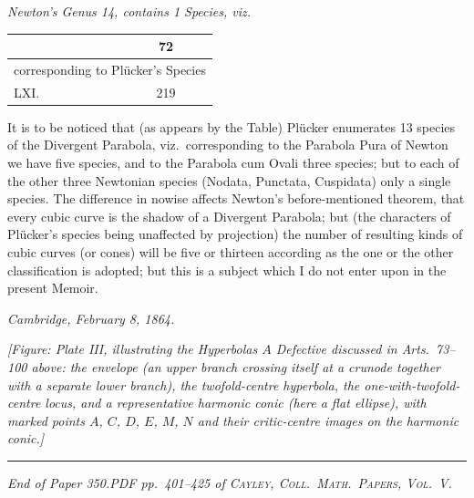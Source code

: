 \documentclass[11pt]{article}
\begin{document}
\medskip
\noindent\emph{Newton's Genus 14, contains 1 Species, viz.}
\begin{center}\small
\begin{tabular}{|l|c|}\hline
& 72 \\\hline
\multicolumn{2}{|l|}{\quad corresponding to Pl\"ucker's Species}\\\hline
LXI. & 219 \\\hline
\end{tabular}
\end{center}

\medskip
It is to be noticed that (as appears by the Table) Pl\"ucker enumerates 13 species of the Divergent Parabola, viz.\ corresponding to the Parabola Pura of Newton we have five species, and to the Parabola cum Ovali three species; but to each of the other three Newtonian species (Nodata, Punctata, Cuspidata) only a single species. The difference in nowise affects Newton's before-mentioned theorem, that every cubic curve is the shadow of a Divergent Parabola; but (the characters of Pl\"ucker's species being unaffected by projection) the number of resulting kinds of cubic curves (or cones) will be five or thirteen according as the one or the other classification is adopted; but this is a subject which I do not enter upon in the present Memoir.

\bigskip
\noindent\textit{Cambridge, February 8, 1864.}

\bigskip
\noindent\textit{[Figure: Plate III, illustrating the Hyperbolas $A$ Defective discussed in Arts.~73--100 above: the envelope (an upper branch crossing itself at a crunode together with a separate lower branch), the twofold-centre hyperbola, the one-with-twofold-centre locus, and a representative harmonic conic (here a flat ellipse), with marked points $A$, $C$, $D$, $E$, $M$, $N$ and their critic-centre images on the harmonic conic.]}

\bigskip
\noindent\rule{\textwidth}{0.4pt}
\bigskip

\begin{center}
\textit{End of Paper 350.\quad PDF pp.~401--425 of \textsc{Cayley, Coll.\ Math.\ Papers, Vol.~V}.}
\end{center}
\end{document}
